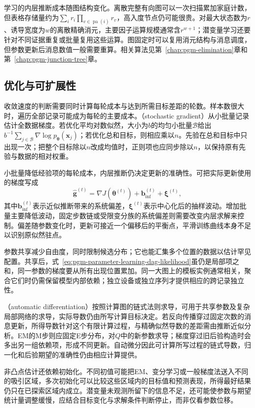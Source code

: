 学习的内层推断成本随图结构变化。离散完整有向图可以一次扫描累加家庭计数，但表格存储量约为$\sum_i r_i\prod_{v\in\operatorname{pa}(i)}r_v$，高入度节点仍可能很贵。对最大状态数为$r$、诱导宽度为$w$的离散精确消元，主要因子运算规模通常含$r^{w+1}$；潜变量学习还要针对不同证据重复或批量复用这些运算。图固定时可以复用消元结构与消息调度，但参数更新后消息数值一般需要重算。相关算法见第~\ref{chap:pgm-elimination}章和第~\ref{chap:pgm-junction-tree}章。

\subsection{优化与可扩展性}
\label{sec:pgm-parameter-learning-scalability}

收敛速度的判断需要同时计算每轮成本与达到所需目标差距的轮数。样本数很大时，遍历全部记录可能成为每轮的主要成本。（stochastic gradient）从小批量记录估计全数据梯度。若优化平均对数似然，大小为$b$的均匀小批量$\mathcal{B}$给出$b^{-1}\sum_{j\in\mathcal{B}}\nabla\log p_{\bm{\theta}}(\bm{x}_j)$；若优化总和目标，则相应乘以$n$。先验在总和目标中只出现一次；把整个目标除以$n$改成均值时，正则项也应同步除以$n$，以保持原有先验与数据的相对权重。

小批量降低经验项的每轮成本，内层推断仍决定更新的准确性。可把实际更新使用的梯度写成
\[
  \widehat{\bm{g}}^{(t)}
   =\nabla J(\bm{\theta}^{(t)})
      +\bm{b}_{\mathrm{inf}}^{(t)}
      +\bm{\xi}^{(t)},
\]
其中$\bm{b}_{\mathrm{inf}}^{(t)}$表示近似推断带来的系统偏差，$\bm{\xi}^{(t)}$表示中心化后的抽样波动。增加批量主要降低波动，固定步数链或受限变分族的系统偏差则需要改变内层求解来控制。偏差随参数变化时，更新可接近一个偏移后的平衡点，平滑训练曲线本身不足以识别原似然驻点。

参数共享减少自由度，同时限制候选分布；它也能汇集多个位置的数据以估计罕见配置。共享后，式~\eqref{eq:pgm-parameter-learning-dag-likelihood}虽仍是局部项之和，同一参数的梯度要从所有出现位置累加。同一大图上的模板实例通常相关，聚合它们时仍需保留模型内部依赖；独立设备或独立序列才提供相应的跨记录独立性。

（automatic differentiation）按照计算图的链式法则求导，可用于共享参数及复杂局部网络的求导，实际导数仍由所写计算目标决定。若反向传播穿过固定次数的消息更新，所得导数针对这个有限计算过程，与精确似然导数的差距需由推断近似分析。EM的M步则应固定E步分布，对$Q$中的新参数求导；梯度穿过旧后验构造时会多出另一组依赖项，形成不同更新。自动微分因此可计算所写过程的链式导数，归一化和后验期望的准确性仍由相应计算提供。

非凸点估计还依赖初始化。不同初值可能把EM、变分学习或一般梯度法送入不同的吸引区域，多次初始化可以比较这些区域内的目标值和预测表现，所得最好结果仍只在已探索区域内成立。潜变量未观测所留下的信息不足，还可能使参数与期望统计量调整缓慢，应结合目标变化与求解条件判断停止，而非仅看参数位移。

